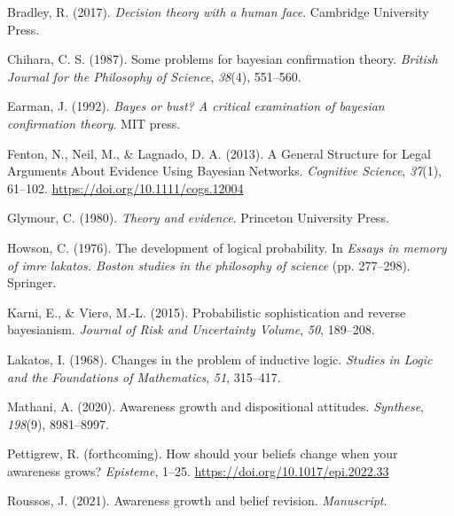 \documentclass[
  11pt,
  dvipsnames,enabledeprecatedfontcommands]{scrartcl}
\newlength{\cslhangindent}
\newlength{\cslentryspacingunit} %
\newenvironment{CSLReferences}[2] %
 {%
  \setlength{\parindent}{0pt}
  \ifodd #1
  \let\oldpar\par
  \def\par{\hangindent=\cslhangindent\oldpar}
  \fi
  \setlength{\parskip}{#2\cslentryspacingunit}
 }%
 {}
\begin{document}
\hypertarget{refs}{}
\begin{CSLReferences}{1}{0}
\leavevmode{}%
Bradley, R. (2017). \emph{Decision theory with a human face}. Cambridge
University Press.

\leavevmode{}%
Chihara, C. S. (1987). Some problems for bayesian confirmation theory.
\emph{British Journal for the Philosophy of Science}, \emph{38}(4),
551--560.

\leavevmode{}%
Earman, J. (1992). \emph{Bayes or bust? A critical examination of
bayesian confirmation theory}. MIT press.

\leavevmode{}%
Fenton, N., Neil, M., \& Lagnado, D. A. (2013). A {General Structure}
for {Legal Arguments About Evidence Using Bayesian Networks}.
\emph{Cognitive Science}, \emph{37}(1), 61--102.
\url{https://doi.org/10.1111/cogs.12004}

\leavevmode{}%
Glymour, C. (1980). \emph{Theory and evidence}. Princeton University
Press.

\leavevmode{}%
Howson, C. (1976). The development of logical probability. In
\emph{Essays in memory of imre lakatos. Boston studies in the philosophy
of science} (pp. 277--298). Springer.

\leavevmode{}%
Karni, E., \& Vierø, M.-L. (2015). Probabilistic sophistication and
reverse bayesianism. \emph{Journal of Risk and Uncertainty Volume},
\emph{50}, 189--208.

\leavevmode{}%
Lakatos, I. (1968). Changes in the problem of inductive logic.
\emph{Studies in Logic and the Foundations of Mathematics}, \emph{51},
315--417.

\leavevmode{}%
Mathani, A. (2020). Awareness growth and dispositional attitudes.
\emph{Synthese}, \emph{198}(9), 8981--8997.

\leavevmode{}%
Pettigrew, R. (forthcoming). How should your beliefs change when your
awareness grows? \emph{Episteme}, 1--25.
\url{https://doi.org/10.1017/epi.2022.33}

\leavevmode{}%
Roussos, J. (2021). Awareness growth and belief revision.
\emph{Manuscript}.


\end{CSLReferences}
\end{document}
